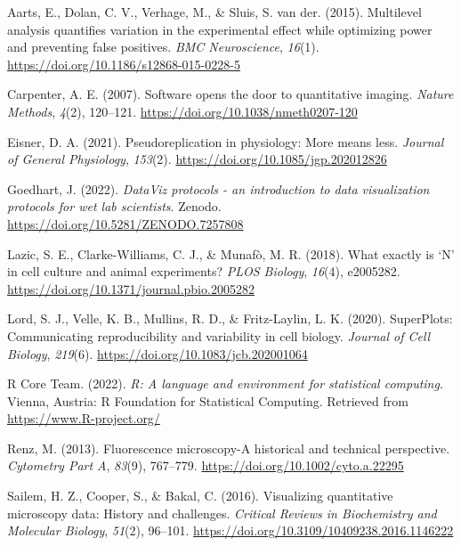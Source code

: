 \documentclass[
]{agujournal2019}
\newlength{\cslhangindent}
\newlength{\cslentryspacingunit} %
\newenvironment{CSLReferences}[2] %
 {%
  \setlength{\parindent}{0pt}
  \ifodd #1
  \let\oldpar\par
  \def\par{\hangindent=\cslhangindent\oldpar}
  \fi
  \setlength{\parskip}{#2\cslentryspacingunit}
 }%
 {}
\begin{document}
\hypertarget{refs}{}
\begin{CSLReferences}{1}{0}
\vspace{1em}

\leavevmode{}%
Aarts, E., Dolan, C. V., Verhage, M., \& Sluis, S. van der. (2015).
Multilevel analysis quantifies variation in the experimental effect
while optimizing power and preventing false positives. \emph{BMC
Neuroscience}, \emph{16}(1).
\url{https://doi.org/10.1186/s12868-015-0228-5}

\leavevmode{}%
Carpenter, A. E. (2007). Software opens the door to quantitative
imaging. \emph{Nature Methods}, \emph{4}(2), 120--121.
\url{https://doi.org/10.1038/nmeth0207-120}

\leavevmode{}%
Eisner, D. A. (2021). Pseudoreplication in physiology: More means less.
\emph{Journal of General Physiology}, \emph{153}(2).
\url{https://doi.org/10.1085/jgp.202012826}

\leavevmode{}%
Goedhart, J. (2022). \emph{DataViz protocols - an introduction to data
visualization protocols for wet lab scientists}. Zenodo.
\url{https://doi.org/10.5281/ZENODO.7257808}

\leavevmode{}%
Lazic, S. E., Clarke-Williams, C. J., \& Munafò, M. R. (2018). What
exactly is {`}N{'} in cell culture and animal experiments? \emph{PLOS
Biology}, \emph{16}(4), e2005282.
\url{https://doi.org/10.1371/journal.pbio.2005282}

\leavevmode{}%
Lord, S. J., Velle, K. B., Mullins, R. D., \& Fritz-Laylin, L. K.
(2020). SuperPlots: Communicating reproducibility and variability in
cell biology. \emph{Journal of Cell Biology}, \emph{219}(6).
\url{https://doi.org/10.1083/jcb.202001064}

\leavevmode{}%
R Core Team. (2022). \emph{R: A language and environment for statistical
computing}. Vienna, Austria: R Foundation for Statistical Computing.
Retrieved from \url{https://www.R-project.org/}

\leavevmode{}%
Renz, M. (2013). Fluorescence microscopy-A historical and technical
perspective. \emph{Cytometry Part A}, \emph{83}(9), 767--779.
\url{https://doi.org/10.1002/cyto.a.22295}

\leavevmode{}%
Sailem, H. Z., Cooper, S., \& Bakal, C. (2016). Visualizing quantitative
microscopy data: History and challenges. \emph{Critical Reviews in
Biochemistry and Molecular Biology}, \emph{51}(2), 96--101.
\url{https://doi.org/10.3109/10409238.2016.1146222}


\end{CSLReferences}
\end{document}
